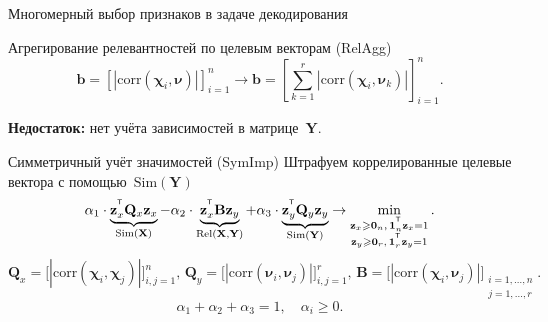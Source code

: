 \documentclass[10pt]{beamer}
\renewcommand{\geq}{\ensuremath{\geqslant}}
\newcommand{\bb}{\mathbf{b}}
\newcommand{\bz}{\mathbf{z}}
\newcommand{\bB}{\mathbf{B}}
\newcommand{\bQ}{\mathbf{Q}}
\newcommand{\bX}{\mathbf{X}}
\newcommand{\bY}{\mathbf{Y}}
\newcommand{\bchi}{\boldsymbol{\chi}}
\newcommand{\bnu}{\boldsymbol{\nu}}
\newcommand{\T}{^{\text{\tiny\sffamily\upshape\mdseries T}}}
\newcommand{\bOne}{\boldsymbol{1}}
\newcommand{\bZero}{\boldsymbol{0}}
\begin{document}
\begin{frame}{Многомерный выбор признаков в задаче декодирования}
	\begin{block}{Агрегирование релевантностей по целевым векторам (RelAgg)}
	\vspace{-0.2cm}
	\[
		\bb = \left[\left|\text{corr}(\bchi_i, \bnu)\right|\right]_{i=1}^n \rightarrow \bb = \left[\sum_{k=1}^r\left|\text{corr}(\bchi_i, \bnu_k)\right|\right]_{i=1}^n.
	\]
	\end{block}
	{\bf Недостаток:} нет учёта зависимостей в матрице~$\bY$. 
	
	\begin{block}{Симметричный учёт значимостей (SymImp)}
	Штрафуем коррелированные целевые вектора с помощью~$\text{Sim} (\bY)$
	\[
	\alpha_1 \cdot \underbrace{\bz_x^{\T} \bQ_x \bz_x}_{\text{Sim}(\bX)} - \alpha_2 \cdot \underbrace{\bz_x^{\T} \bB \bz_y}_{\text{Rel}(\bX, \bY)} + \alpha_3 \cdot \underbrace{\bz_y^{\T} \bQ_y \bz_y}_{\text{Sim}(\bY)} \rightarrow \min_{\substack{\bz_x \geq \bZero_n, \, \bOne_n^{\T}\bz_x=1 \\ \bz_y \geq \bZero_r, \, \bOne_r^{\T}\bz_y=1}}.
	\]
	\[
	\bQ_x = \bigl[ \left| \text{corr}(\bchi_i, \bchi_j) \right| \bigr]_{i,j=1}^n, \,
	\bQ_y = \bigl[ \left| \text{corr}(\bnu_i, \bnu_j) \right| \bigr]_{i,j=1}^r, \,
	\bB =  \bigl[ \left| \text{corr}(\bchi_i, \bnu_j) \right| \bigr]_{\substack{i=1, \dots, n \\ j=1, \dots, r}}.
	\]
	\[
	\alpha_1 + \alpha_2 + \alpha_3 = 1, \quad \alpha_i \geq 0.
	\] 
	\end{block}
\end{frame}
\end{document}
